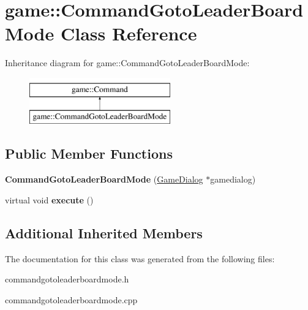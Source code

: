 \hypertarget{classgame_1_1CommandGotoLeaderBoardMode}{}\section{game\+:\+:Command\+Goto\+Leader\+Board\+Mode Class Reference}
\label{classgame_1_1CommandGotoLeaderBoardMode}
Inheritance diagram for game\+:\+:Command\+Goto\+Leader\+Board\+Mode\+:\begin{figure}[H]
\begin{center}
\leavevmode
\includegraphics[height=2.000000cm]{classgame_1_1CommandGotoLeaderBoardMode}
\end{center}
\end{figure}
\subsection*{Public Member Functions}
\begin{DoxyCompactItemize}
\item 
\mbox{\label{classgame_1_1CommandGotoLeaderBoardMode_aec26d3b15f46a80fb10014dde9f704be}} 
{\bfseries Command\+Goto\+Leader\+Board\+Mode} (\hyperlink{classgame_1_1GameDialog}{Game\+Dialog} $\ast$gamedialog)
\item 
\mbox{\label{classgame_1_1CommandGotoLeaderBoardMode_a9ec6c7778ff5e2b687f8e5558c330afe}} 
virtual void {\bfseries execute} ()
\end{DoxyCompactItemize}
\subsection*{Additional Inherited Members}


The documentation for this class was generated from the following files\+:\begin{DoxyCompactItemize}
\item 
commandgotoleaderboardmode.\+h\item 
commandgotoleaderboardmode.\+cpp\end{DoxyCompactItemize}
